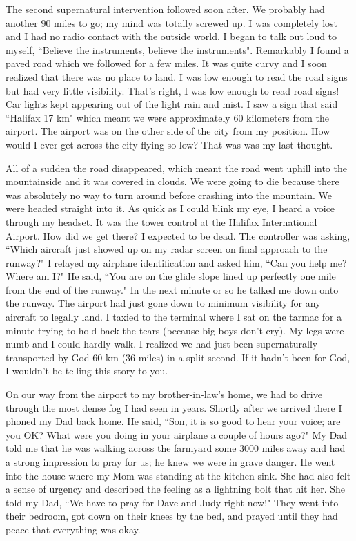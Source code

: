 \documentclass[oneside]{book}
\begin{document}
The second supernatural intervention followed soon after. We probably had another 90 miles to go; my mind was totally screwed up. I was completely lost and I had no radio contact with the outside world. I began to talk out loud to myself, ``Believe the instruments, believe the instruments". Remarkably I found a paved road which we followed for a few miles. It was quite curvy and I soon realized that there was no place to land. I was low enough to read the road signs but had very little visibility. That's right, I was low enough to read road signs! Car lights kept appearing out of the light rain and mist. I saw a sign that said ``Halifax 17 km" which meant we were approximately 60 kilometers from the airport. The airport was on the other side of the city from my position. How would I ever get across the city flying so low? That was was my last thought. 

All of a sudden the road disappeared, which meant the road went uphill into the mountainside and it was covered in clouds. We were going to die because there was absolutely no way to turn around before crashing into the mountain. We were headed straight into it. As quick as I could blink my eye, I heard a voice through my headset. It was the tower control at the Halifax International Airport. How did we get there? I expected to be dead. The controller was asking, ``Which aircraft just showed up on my radar screen on final approach to the runway?" I relayed my airplane identification and asked him, ``Can you help me? Where am I?" He said, ``You are on the glide slope lined up perfectly one mile from the end of the runway." In the next minute or so he talked me down onto the runway. The airport had just gone down to minimum visibility for any aircraft to legally land. I taxied to the terminal where I sat on the tarmac for a minute trying to hold back the tears (because big boys don't cry). My legs were numb and I could hardly walk. I realized we had just been supernaturally transported by God 60 km (36 miles) in a split second. If it hadn't been for God, I wouldn't be telling this story to you.

On our way from the airport to my brother-in-law's home, we had to drive through the most dense fog I had seen in years. Shortly after we arrived there I phoned my Dad back home. He said, ``Son, it is so good to hear your voice; are you OK? What were you doing in your airplane a couple of hours ago?" My Dad told me that he was walking across the farmyard some 3000 miles away and had a strong impression to pray for us; he knew we were in grave danger. He went into the house where my Mom was standing at the kitchen sink. She had also felt a sense of urgency and described the feeling as a lightning bolt that hit her. She told my Dad, ``We have to pray for Dave and Judy right now!" They went into their bedroom, got down on their knees by the bed, and prayed until they had peace that everything was okay.
\end{document}
